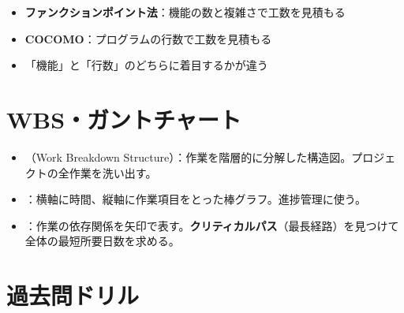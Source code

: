 \begin{pitfall}
\begin{itemize}
  \item \textbf{ファンクションポイント法}：機能の数と複雑さで工数を見積もる
  \item \textbf{COCOMO}：プログラムの行数で工数を見積もる
  \item 「機能」と「行数」のどちらに着目するかが違う
\end{itemize}
\end{pitfall}

\section{WBS・ガントチャート}

\begin{teigi}[WBSとガントチャート]
\begin{itemize}
  \item {}（Work Breakdown Structure）：作業を階層的に分解した構造図。プロジェクトの全作業を洗い出す。
  \item {}：横軸に時間、縦軸に作業項目をとった棒グラフ。進捗管理に使う。
  \item {}：作業の依存関係を矢印で表す。\textbf{クリティカルパス}（最長経路）を見つけて全体の最短所要日数を求める。
\end{itemize}
\end{teigi}

\begin{hikaku}[PM手法の使い分け]
\end{hikaku}

\section{過去問ドリル}

